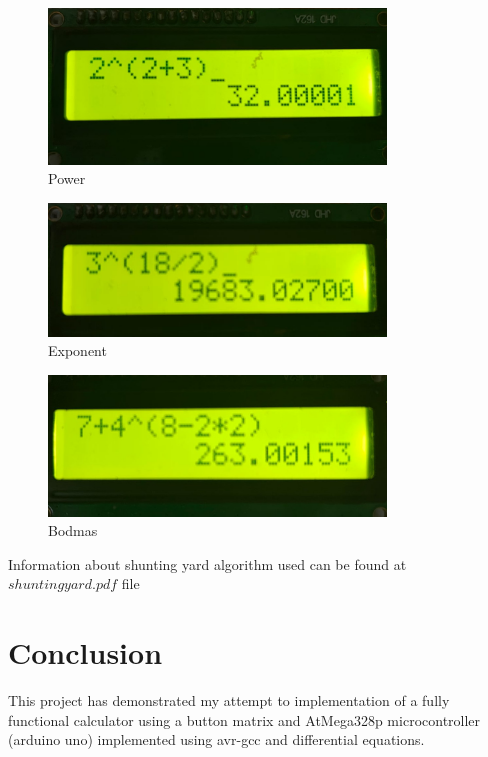 \documentclass[a4paper,12pt]{article}
\begin{document}
\begin{figure}
  \begin{center}
    \includegraphics[width=0.8\textwidth]{figs/pow.png}
  \end{center}
  \caption{Power}
  \label{fig:Power}
\end{figure}
\begin{figure}
  \begin{center}
    \includegraphics[width=0.8\textwidth]{figs/pow1.png}
  \end{center}
  \caption{Exponent}
  \label{fig:Exponent}
\end{figure}
\begin{figure}
  \begin{center}
    \includegraphics[width=0.8\textwidth]{figs/bod.png}
  \end{center}
  \caption{Bodmas}
  \label{fig:Bodmas}
\end{figure}
Information about shunting yard algorithm used can be found at $shunting yard.pdf$ file
\section*{Conclusion}
This project has demonstrated my attempt to implementation of a fully functional calculator using a button matrix and AtMega328p microcontroller (arduino uno) implemented using avr-gcc and differential equations. 
\end{document}
